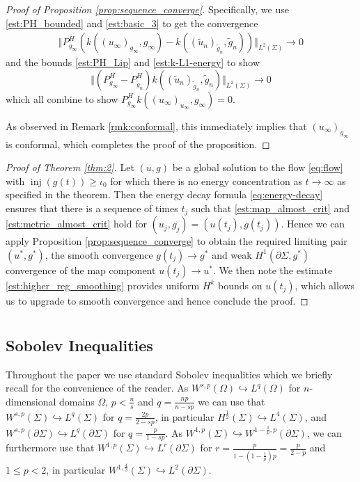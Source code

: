 \documentclass[10pt,reqno]{amsart}
\theoremstyle{plain}
\theoremstyle{definition}
\numberwithin{equation}{section}
\newcommand{\Om}{\Omega}
\newcommand{\Si}{\Sigma}
\DeclareMathOperator{\inj}{inj}
\newcommand{\norm}[1]{\Vert#1\Vert}
\newcommand{\half}{\frac{1}{2}}
\newcommand{\pSi}{{\partial \Sigma}}
\newcommand{\p}{\partial} %
\begin{document}
\begin{proof}[Proof of Proposition \ref{prop:sequence_converge}]
    Specifically, we use \eqref{est:PH_bounded} and \eqref{est:basic_3} to get the convergence
    \begin{align*}
        \norm{P_{g_\infty}^{H}\left(k((u_\infty)_{g_\infty},g_\infty) - k((\tilde{u}_n)_{\tilde{g}_n},\tilde{g}_n)\right)}_{L^2(\Si)} \rightarrow 0
    \end{align*}
    and the bounds \eqref{est:PH_Lip} and \eqref{est:k-L1-energy} to show
    \begin{equation*}
        \norm{(P_{g_\infty}^{H} - P_{\tilde{g}_n}^H) k((\tilde{u}_n)_{\tilde{g}_n},\tilde{g}_n)}_{L^2(\Si)} \rightarrow 0
    \end{equation*}
    which all combine to show $P_{g_\infty}^{H}k((u_\infty)_{u_\infty},g_\infty) = 0$.
    
    As observed in Remark \ref{rmk:conformal}, this immediately implies that $(u_\infty)_{g_\infty}$ is conformal, which completes the proof of the proposition.
\end{proof}

\begin{proof}[Proof of Theorem \ref{thm:2}]
Let  $(u,g)$ be a global solution to the flow \eqref{eq:flow} with $\inj(g(t)) \geq \iota_0$ for which there is no energy concentration as $t\to \infty$ as specified in the theorem. 
Then the energy decay formula \eqref{eq:energy-decay} ensures that there is a sequence of times $t_j$ such that \eqref{est:map_almost_crit} and \eqref{est:metric_almost_crit} hold
for $(u_j,g_j) = (u(t_j),g(t_j))$. Hence we can apply Proposition \ref{prop:sequence_converge} to obtain the required limiting pair $(u^*,g^*)$, the smooth convergence $g(t_j) \rightarrow g^*$ and weak $H^1(\p\Si,g^*)$ convergence of the map component $u(t_j) \rightarrow u^*$. We then note the estimate \eqref{est:higher_reg_smoothing} provides uniform $H^k$ bounds on $u(t_j)$, which allows us to upgrade to smooth convergence and hence conclude the proof.
\end{proof}


\appendix

\section{}


\subsection{Sobolev Inequalities}
Throughout the paper we use standard Sobolev inequalities which we briefly recall for the convenience of the reader. 
As 
$W^{s,p}(\Om)\hookrightarrow L^{q}(\Om)$ for $n$-dimensional domains $\Om$, $p<\frac{n}{s}$ and $q= \frac{np}{n-sp}$ we can use that $W^{s,p}(\Si)\hookrightarrow L^{q}(\Si)$ for $q=\frac{2p}{2-sp}$, 
in particular  $H^{\half}(\Si)\hookrightarrow L^4(\Si)$,
    and  $W^{s,p}(\pSi)\hookrightarrow L^{q}(\p\Si)$ for $q=\frac{p}{1-sp}$. 
    As  $W^{1,p}(\Si)\hookrightarrow W^{1-\frac{1}{p},p}(\pSi)$, we 
can furthermore use that 
$W^{1,p}(\Si)\hookrightarrow L^r(\pSi)$ for $r= \frac{p}{1-(1-\frac1p)p}=\frac{p}{2-p}$ and $1\leq p<2$, in particular $W^{1,\frac43}(\Si)\hookrightarrow L^2(\pSi)$. 
\end{document}
